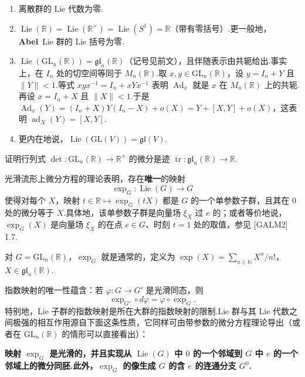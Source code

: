\begin{numpara}[经由 $G$ 的伴随表示的微分]
\begin{example*}
\begin{enumerate}[label=\roman*)]
\item 离散群的 Lie 代数为零.
\item $\operatorname{Lie}(\mathbb{R})=\operatorname{Lie}(\mathbb{R}^{\times})=\operatorname{Lie}(S^{1})=\mathbb{R}$（带有零括号）.更一般地，\textbf{Abel}~Lie 群的 Lie 括号为零.
\item $\operatorname{Lie}(\mathrm{GL}_n(\mathbb{R}))=\mathfrak{gl}_n(\mathbb{R})$（记号见前文），且伴随表示由共轭给出.事实上，在 $I_n$ 处的切空间等同于 $M_n(\mathbb{R})$.取 $x,y\in\mathrm{GL}_n(\mathbb{R})$，设 $y=I_n+Y$ 且 $\lVert Y\rVert<1$.等式 $xyx^{-1}=I_n+xYx^{-1}$ 表明 $\operatorname{Ad}_x$ 就是 $x$ 在 $M_n(\mathbb{R})$ 上的共轭.再设 $x=I_n+X$ 且 $\lVert X\rVert<1$.于是 $\operatorname{Ad}_x(Y)=(I_n+X)Y(I_n-X)+o(X)=Y+[X,Y]+o(X)$，这表明 $\operatorname{ad}_X(Y)=[X,Y]$.
\item 更内在地说，$\operatorname{Lie}(\mathrm{GL}(V))=\mathfrak{gl}(V)$.
\end{enumerate}
\end{example*}

\begin{exercise*}
证明行列式 $\det\colon\mathrm{GL}_n(\mathbb{R})\longrightarrow\mathbb{R}^{\times}$ 的微分是迹 $\operatorname{tr}\colon\mathfrak{gl}_n(\mathbb{R})\longrightarrow\mathbb{R}$.
\end{exercise*}
\end{numpara}

\begin{numpara}[指数映射]\label{np:ssl-1-3-3}
光滑流形上微分方程的理论表明，存在\textbf{唯一}的映射
\[
\exp_G\colon\operatorname{Lie}(G)\longrightarrow G
\]
使得对每个 $X$，映射 $t\in\mathbb{R}\mapsto\exp_G(tX)$ 都是 $G$ 的一个单参数子群，且其在 $0$ 处的微分等于 $X$.具体地，该单参数子群是向量场 $\xi_X$ 过 $e$ 的；或者等价地说，$\exp_G(X)$ 是向量场 $\xi_X$ 的在点 $e\in G$、时刻 $t=1$ 处的取值，参见 [GALM2] 1.7.

\begin{example*}
对 $G=\mathrm{GL}_n(\mathbb{R})$，$\exp_G$ 就是通常的，定义为 $\exp(X)=\sum_{n\in\mathbb{N}}X^{n}/n!$，$X\in\mathfrak{gl}_n(\mathbb{R})$.
\end{example*}

指数映射的唯一性蕴含：若 $\varphi\colon G\longrightarrow G'$ 是光滑同态，则
\[
\exp_{G'}\circ d\varphi=\varphi\circ\exp_G .
\]
特别地，Lie 子群的指数映射是所在大群的指数映射的限制.Lie 群与其 Lie 代数之间极强的相互作用源自下面这条性质，它同样可由带参数的微分方程理论导出（或者在 $\mathrm{GL}_n(\mathbb{R})$ 的情形可以直接看出）：

\noindent\textbf{映射 $\exp_G$ 是光滑的，并且实现从 $\operatorname{Lie}(G)$ 中 $0$ 的一个邻域到 $G$ 中 $e$ 的一个邻域上的微分同胚.此外，$\exp_G$ 的像生成 $G$ 的含 $e$ 的连通分支 $G^{0}$.}
\end{numpara}

